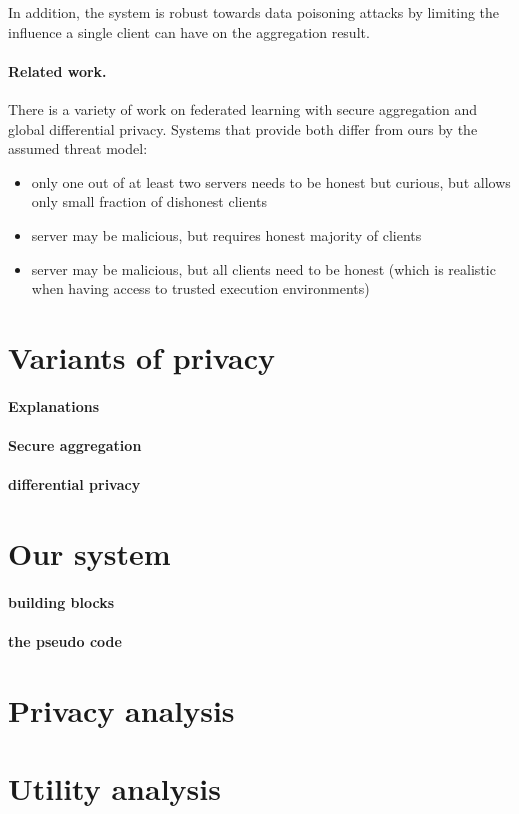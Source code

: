 \documentclass{article}
\begin{document}
In addition, the system is robust towards data poisoning attacks by limiting the influence a single client can have on the aggregation result.

\paragraph{Related work.}
There is a variety of work on federated learning with secure aggregation and global differential privacy. Systems that provide both differ from ours by the assumed threat model:
\begin{itemize}
\item\cite{dprio} only one out of at least two servers needs to be honest but curious, but allows only small fraction of dishonest clients
\item\cite{Stevens2021EfficientDP} server may be malicious, but requires honest majority of clients
\item\cite{Kairouz2021TheDD} server may be malicious, but all clients need to be honest (which is realistic when having access to trusted execution environments)
\end{itemize}

\section{Variants of privacy}

\paragraph{Explanations}

\paragraph{Secure aggregation}

\paragraph{differential privacy}

\section{Our system}

\paragraph{building blocks}

\paragraph{the pseudo code}

\section{Privacy analysis}


\section{Utility analysis}



\end{document}
